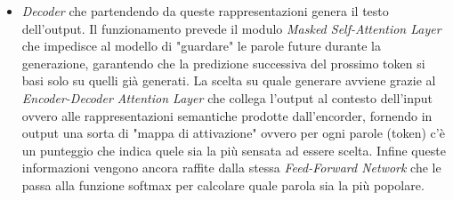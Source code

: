 \documentclass{article}
\begin{document}
\begin{itemize}
\begin{itemize}
    \item \textit{Decoder} che partendendo da queste rappresentazioni genera il testo dell'output. Il funzionamento prevede il modulo \textit{Masked Self-Attention Layer} che impedisce al modello di "guardare" le parole future durante la generazione, garantendo che la predizione successiva del prossimo token si basi solo su quelli già generati. La scelta su quale generare avviene grazie al \textit{Encoder-Decoder Attention Layer} che collega l'output al contesto dell'input ovvero alle rappresentazioni semantiche prodotte dall'encorder, fornendo in output una sorta di "mappa di attivazione" ovvero per ogni parole (token) c'è un punteggio che indica quele sia la più sensata ad essere scelta. Infine queste informazioni vengono ancora raffite dalla stessa \textit{Feed-Forward Network} che le passa alla funzione softmax per calcolare quale parola sia la più popolare.


\end{itemize}
\end{itemize}
\end{document}
